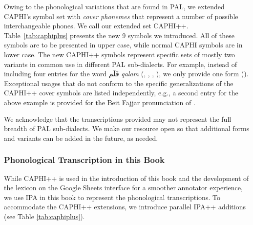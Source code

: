 Owing to the phonological variations that are found in PAL, we extended CAPHI's symbol set with \textit{cover phonemes} that represent a number of possible interchangeable phones.  We call our extended set CAPHI++.  Table~\ref{tab:caphiplus} presents the new 9 symbols we introduced. All of these symbols are to be presented in upper case, while normal CAPHI symbols are in lower case. The new CAPHI++ symbols represent specific sets of mostly two variants in common use in different PAL sub-dialects.
For example, instead of including four entries for the word \foreignlanguage{arabic}{قَلَم} {\it qalam} 
(, ,  , 
),
we only provide one form ().
Exceptional usages that do not conform to the specific generalizations of the CAPHI++ cover symbols are listed independently, e.g., a second entry for the above example is provided for the Beit Fajjar pronunciation of .

We acknowledge that the transcriptions provided may not represent the full breadth of PAL sub-dialects.  We make our resource open so that additional forms and variants can be added in the future, as needed.

\subsubsection*{Phonological Transcription in this Book}
While CAPHI++ is used in the introduction of this book and the development of the lexicon on the Google Sheets interface for a smoother annotator experience, we use IPA in this book to represent the phonological transcriptions. To accommodate the CAPHI++ extensions, we introduce parallel IPA++ additions (see Table \ref{tab:caphiplus}).


